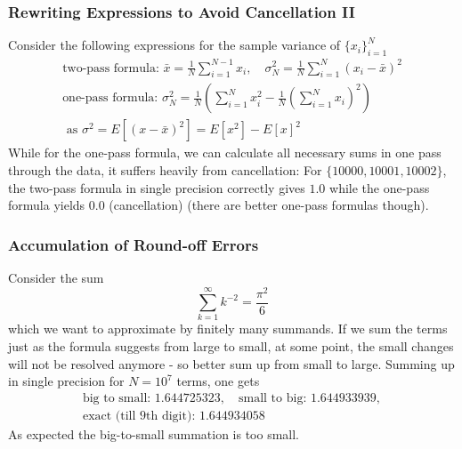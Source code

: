 \subsubsection{Rewriting Expressions to Avoid Cancellation II}
Consider the following expressions for the sample variance of $\{x_i\}_{i=1}^N$
\begin{equation}
    \begin{multlined}
        \text{two-pass formula: } \bar{x} = \frac{1}{N} \sum_{i=1}^{N-1} x_i, \quad \sigma^2_N = \frac{1}{N} \sum_{i=1}^N (x_i - \bar{x})^2 \\ \text{one-pass formula: } \sigma^2_N = \frac{1}{N} \left( \sum_{i=1}^N x_i^2 - \frac{1}{N} \left( \sum_{i=1}^N x_i \right)^2 \right) \\ \text{ as } \sigma^2 = E[(x-\bar{x})^2] = E[x^2] - E[x]^2
    \end{multlined}
\end{equation}
While for the one-pass formula, we can calculate all necessary sums in one pass through the data, it suffers heavily from cancellation: For $\{10000,10001,10002\}$, the two-pass formula in single precision correctly gives $1.0$ while the one-pass formula yields $0.0$ (cancellation) (there are better one-pass formulas though).

\subsubsection{Accumulation of Round-off Errors}
Consider the sum
\begin{equation}
    \sum_{k=1}^\infty k^{-2} = \frac{\pi^2}{6}
\end{equation}
which we want to approximate by finitely many summands. If we sum the terms
just as the formula suggests from large to small, at some point, the small changes will not be resolved anymore - so better
sum up from small to large. Summing up in single precision for $N=10^7$ terms, one gets
\begin{equation}
    \begin{multlined}
        \text{big to small: } 1.644725323, \quad \text{small to big: } 1.644933939, \\ \text{exact (till 9th digit): } 1.644934058
    \end{multlined}
\end{equation}
As expected the big-to-small summation is too small.

